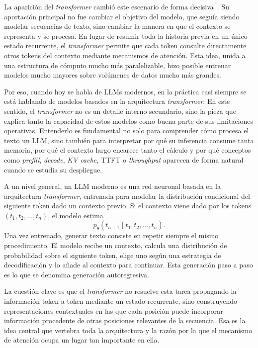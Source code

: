 La aparición del \textit{transformer} cambió este escenario de forma decisiva~\cite{vaswani2017attention}. Su aportación principal no fue cambiar el objetivo del modelo, que seguía siendo modelar secuencias de texto, sino cambiar la manera en que el contexto se representa y se procesa. En lugar de resumir toda la historia previa en un único estado recurrente, el \textit{transformer} permite que cada token consulte directamente otros tokens del contexto mediante mecanismos de atención. Esta idea, unida a una estructura de cómputo mucho más paralelizable, hizo posible entrenar modelos mucho mayores sobre volúmenes de datos mucho más grandes.

Por eso, cuando hoy se habla de LLMs modernos, en la práctica casi siempre se está hablando de modelos basados en la arquitectura \textit{transformer}. En este sentido, el \textit{transformer} no es un detalle interno secundario, sino la pieza que explica tanto la capacidad de estos modelos como buena parte de sus limitaciones operativas. Entenderlo es fundamental no solo para comprender cómo procesa el texto un LLM, sino también para interpretar por qué su inferencia consume tanta memoria, por qué el contexto largo encarece tanto el cálculo y por qué conceptos como \textit{prefill}, \textit{decode}, \textit{KV cache}, TTFT o \textit{throughput} aparecen de forma natural cuando se estudia su despliegue.

A un nivel general, un LLM moderno es una red neuronal basada en la arquitectura \textit{transformer}, entrenada para modelar la distribución condicional del siguiente token dado un contexto previo. Si el contexto viene dado por los tokens $(t_1, t_2, \dots, t_n)$, el modelo estima
\[
p_\theta(t_{n+1} \mid t_1, t_2, \dots, t_n).
\]
Una vez entrenado, generar texto consiste en repetir siempre el mismo procedimiento. El modelo recibe un contexto, calcula una distribución de probabilidad sobre el siguiente token, elige uno según una estrategia de decodificación y lo añade al contexto para continuar. Esta generación paso a paso es lo que se denomina generación autoregresiva.

La cuestión clave es que el \textit{transformer} no resuelve esta tarea propagando la información token a token mediante un estado recurrente, sino construyendo representaciones contextuales en las que cada posición puede incorporar información procedente de otras posiciones relevantes de la secuencia. Esa es la idea central que vertebra toda la arquitectura y la razón por la que el mecanismo de atención ocupa un lugar tan importante en ella.

